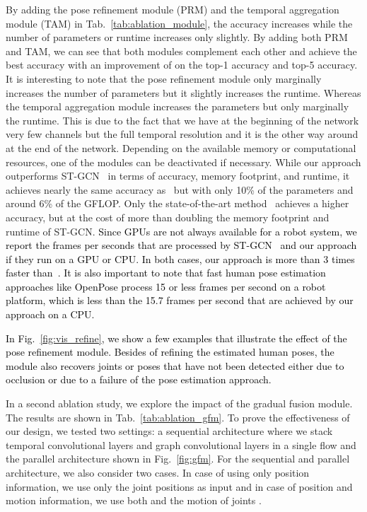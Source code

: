 \documentclass[letterpaper, 10 pt, conference]{ieeeconf}
\newcommand{\todo}[1]{{\textcolor{black}{#1}}}
\begin{document}
By adding the pose refinement module (PRM) and the temporal aggregation module (TAM) in Tab.~\ref{tab:ablation_module}, the accuracy increases while the number of parameters or runtime increases only slightly. By adding both PRM and TAM, we can see that both modules complement each other and achieve the best accuracy with an improvement of  on the top-1 accuracy and top-5 accuracy. It is interesting to note that the pose refinement module only marginally increases the number of parameters but it slightly increases the runtime. Whereas the temporal aggregation module increases the parameters but only marginally the runtime. This is due to the fact that we have at the beginning of the network very few channels but the full temporal resolution and it is the other way around at the end of the network. Depending on the available memory or computational resources, one of the modules can be deactivated if necessary. While our approach outperforms ST-GCN~\cite{yan2018spatial} in terms of accuracy, memory footprint, and runtime, it achieves nearly the same accuracy as~\cite{li2019actional} but with only 10\% of the parameters and around 6\% of the GFLOP. Only the state-of-the-art method~\cite{shi2019two} achieves a higher accuracy, but at the cost of more than doubling the memory footprint and runtime of ST-GCN. \todo{Since GPUs are not always available for a robot system, we report the frames per seconds that are processed by ST-GCN~\cite{yan2018spatial} and our approach if they run on a GPU or CPU. In both cases, our approach is more than 3 times faster than~\cite{yan2018spatial}. It is also important to note that fast human pose estimation approaches like OpenPose process 15 or less frames per second on a robot platform, which is less than the 15.7 frames per second that are achieved by our approach on a CPU.}



\todo{In Fig.~\ref{fig:vis_refine}, we show a few examples that illustrate the effect of the pose refinement module. Besides of refining the estimated human poses, the module also recovers joints or poses that have not been detected either due to occlusion or due to a failure of the pose estimation approach.} 




In a second ablation study, we explore the impact of the gradual fusion module. The results are shown in Tab.~\ref{tab:ablation_gfm}. To prove the effectiveness of our design, we tested two settings: a sequential architecture where we stack temporal convolutional layers and graph convolutional layers in a single flow and the parallel architecture shown in Fig.~\ref{fig:gfm}. For the sequential and parallel architecture, we also consider two cases. In case of using only position information, we use only the joint positions  as input and in case of position and motion information, we use both  and the motion of joints . 
\end{document}
